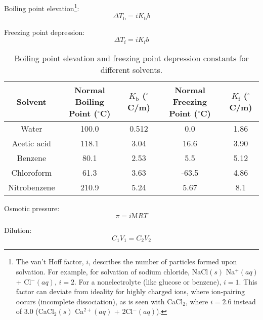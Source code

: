 \documentclass[10pt]{article}
\def\deg{$^{\circ}$}
\begin{document}
Boiling point elevation\footnote{The van't Hoff factor, $i$, describes the number of particles formed upon solvation. For example, for solvation of sodium chloride, NaCl$(s)$ \ce{->} Na$^{+}(aq)$ + Cl$^{-}(aq)$, $i=2$. For a nonelectrolyte (like glucose or benzene), $i=1$. This factor can deviate from ideality for highly charged ions, where ion-pairing occurs (incomplete dissociation), as is seen with CaCl$_{2}$, where $i=2.6$ instead of 3.0 (CaCl$_{2}(s)$ \ce{->} Ca$^{2+}(aq)$ + 2Cl$^{-}(aq)$).}:
\begin{equation*} 
\Delta T_\textrm{b} = iK_\textrm{b}b
\end{equation*}

Freezing point depression:
\begin{equation*}
\Delta T_\textrm{f} = iK_\textrm{f}b
\end{equation*}

\begin{table}[H]
	\centering
	\caption{Boiling point elevation and freezing point depression constants for different solvents.}
		\begin{tabular}{cSSSS}
			\toprule
            Solvent & {Normal Boiling Point (\deg C)} & {$K_\textrm{b}$ (\deg C/m)} & {Normal Freezing Point (\deg C)} & {$K_\textrm{f}$ (\deg C/m)} \\ 
            \midrule
            Water & 100.0 & 0.512 & 0.0 & 1.86\\
            Acetic acid & 118.1 & 3.04 & 16.6 & 3.90\\
            Benzene & 80.1 & 2.53 & 5.5 & 5.12  \\
            Chloroform & 61.3 & 3.63 & -63.5 & 4.86\\
            Nitrobenzene & 210.9 & 5.24 & 5.67 & 8.1 \\
            \bottomrule
		\end{tabular}
\end{table}

Osmotic pressure:
\begin{equation*}
\pi=i\textrm{M}RT
\end{equation*}

Dilution:
\begin{equation*}
C_1V_1=C_2V_2
\end{equation*}

\end{document}
